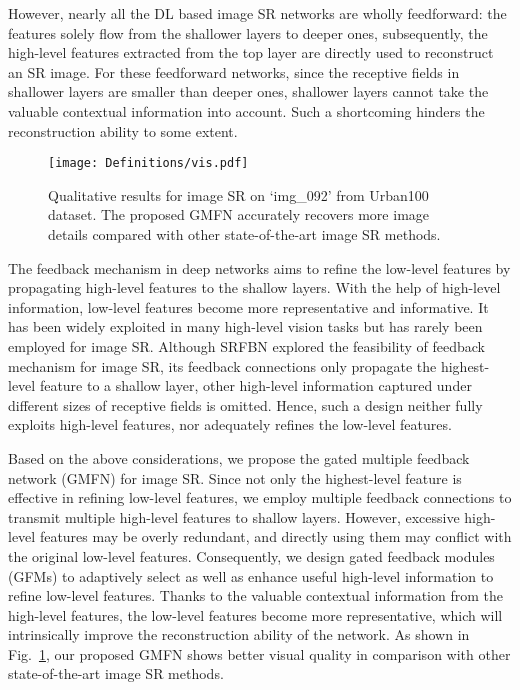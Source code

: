 \documentclass{bmvc2k}
\begin{document}
	However, nearly all the DL based image SR networks are wholly feedforward: the features solely flow from the shallower layers to deeper ones, subsequently, the high-level features extracted from the top layer are directly used to reconstruct an SR image. For these feedforward networks, since the receptive fields in shallower layers are smaller than deeper ones, shallower layers cannot take the valuable contextual information into account. Such a shortcoming hinders the reconstruction ability to some extent. 

	\begin{figure}[tbp]
	\centering
	\texttt{[image: Definitions/vis.pdf]}
	\vspace{-5mm}
	\caption{Qualitative results for  image SR on `img\_092' from Urban100 dataset. The proposed GMFN accurately recovers more image details compared with other state-of-the-art image SR methods.}
	\label{fig:vis1}
	\vspace{-6mm}
	\end{figure} 
	
	The feedback mechanism in deep networks aims to refine the low-level features by propagating high-level features to the shallow layers. With the help of high-level information, low-level features become more representative and informative. It has been widely exploited in many high-level vision tasks \cite{carreira2016human, zamir2017feedback,jin2017multi, sam2018top, zhang2018progressive, li2019srfbn} but has rarely been employed for image SR. Although SRFBN \cite{li2019srfbn} explored the feasibility of feedback mechanism for image SR, its feedback connections only propagate the highest-level feature to a shallow layer, other high-level information captured under different sizes of receptive fields is omitted. Hence, such a design neither fully exploits high-level features, nor adequately refines the low-level features.
	
	Based on the above considerations, we propose the gated multiple feedback network (GMFN) for image SR. Since not only the highest-level feature is effective in refining low-level features, we employ multiple feedback connections to transmit multiple high-level features to shallow layers. However, excessive high-level features may be overly redundant, and directly using them may conflict with the original low-level features. Consequently, we design gated feedback modules (GFMs) to adaptively select as well as enhance useful high-level information to refine low-level features. Thanks to the valuable contextual information from the high-level features, the low-level features become more representative, which will intrinsically improve the reconstruction ability of the network. As shown in Fig.~\ref{fig:vis1}, our proposed GMFN shows better visual quality in comparison with other state-of-the-art image SR methods.
\end{document}
